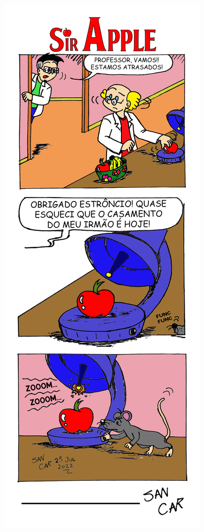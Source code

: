 \begin{minipage}{9cm} %
    \includegraphics[width=\textwidth]{Tirinha/Tirinha_Fig/Tirinha_Sir_Apple.jpg}
\end{minipage}










